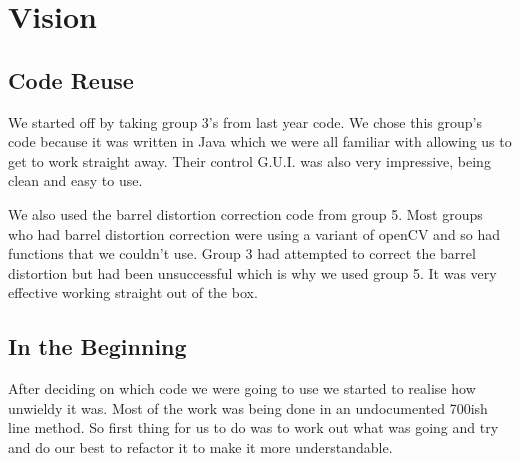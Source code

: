 \section{Vision}

\subsection{Code Reuse}

We started off by taking group 3's from last year code.  We chose this group's code because it was written in Java which we were all familiar with allowing us to get to work straight away.  Their control G.U.I. was also very impressive, being clean and easy to use.

We also used the barrel distortion correction code from group 5.  Most groups who had barrel distortion correction were using a variant of openCV and so had functions that we couldn't use.  Group 3 had attempted to correct the barrel distortion but had been unsuccessful which is why we used group 5.  It was very effective working straight out of the box.

\subsection{In the Beginning}

After deciding on which code we were going to use we started to realise how unwieldy it was.  Most of the work was being done in an undocumented 700ish line method.  So first thing for us to do was to work out what was going and try and do our best to refactor it to make it more understandable.




